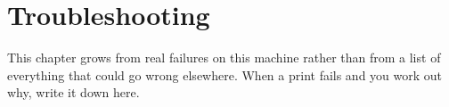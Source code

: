 
\chapter{Troubleshooting}

 This chapter grows from real failures on this
machine rather than from a list of everything that could go wrong elsewhere.
When a print fails and you work out why, write it down here.

